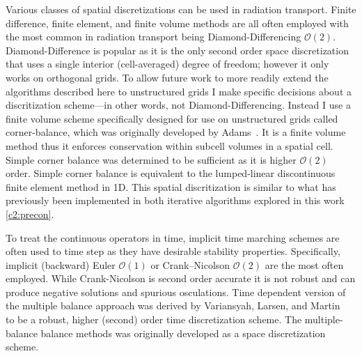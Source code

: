 Various classes of spatial discretizations can be used in radiation transport.
Finite difference, finite element, and finite volume methods are all often employed with the most common in radiation transport being Diamond-Differencing $\mathcal{O}(2)$.
Diamond-Difference is popular as it is the only second order space discretization that uses a single interior (cell-averaged) degree of freedom; however it only works on orthogonal grids.
To allow future work to more readily extend the algorithms described here to unstructured grids I make specific decisions about a discritization scheme---in other words, not Diamond-Differencing.
Instead I use a finite volume scheme specifically designed for use on unstructured grids called corner-balance, which was originally developed by Adams~\cite{adams_subcell_1997}.
It is a finite volume method thus it enforces conservation within subcell volumes in a spatial cell.
Simple corner balance was determined to be sufficient as it is higher $\mathcal{O}(2)$ order.
Simple corner balance is equivalent to the lumped-linear discontinuous finite element method in 1D.
This spatial discritization is similar to what has previously been implemented in both iterative algorithms explored in this work \ref{c2:precon}.

To treat the continuous operators in time, implicit time marching schemes are often used to time step as they have desirable stability properties.
Specifically, implicit (backward) Euler $\mathcal{O}(1)$ or Crank--Nicolson $\mathcal{O}(2)$ \cite{nicolson_phd, Crank_Nicolson_1947} are the most often employed.
While Crank-Nicolson is second order accurate it is not robust and can produce negative solutions and spurious osculations.
Time dependent version of the multiple balance approach was derived by Variansyah, Larsen, and Martin~\cite{variansyah_robust_2021, ilham_phd} to be a robust, higher (second) order time discretization scheme.
The multiple-balance balance methods was originally developed as a space discretization scheme.

